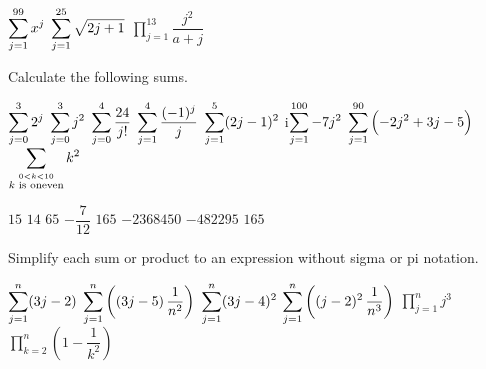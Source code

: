 \begin{Answer}\phantom{}
    \begin{multicols}{3}
		
		\Question $\displaystyle\sum_{j=1}^{99} x^j$ 
		\Question $\displaystyle\sum_{j=1}^{25} \sqrt{2j+1}$ 
		\Question $\displaystyle\prod_{j=1}^{13} \dfrac{j^2}{a+j}$ 
	    \EndCurrentQuestion
	\end{multicols}
\end{Answer}
	
\begin{Exercise} Calculate the following sums.
    \begin{multicols}{3}
    	\Question[difficulty = 1] $\displaystyle\sum_{j=0}^{3} 2^j$
    	\Question[difficulty = 1] $\displaystyle\sum_{j=0}^{3} j^2$
    	\Question[difficulty = 1] $\displaystyle\sum_{j=0}^{4} \dfrac{24}{j!}$
    	\Question[difficulty = 1] $\displaystyle\sum_{j=1}^{4} \dfrac{(-1)^j}{j}$
    	\Question[difficulty = 1] $\displaystyle\sum_{j=1}^{5} (2j-1)^2$
    	\ifanalysis\Question[difficulty = 1]i\fi \ifcalculus\Question[difficulty = 2]\fi $\displaystyle\sum_{j=1}^{100} -7j^2$
    	\ifanalysis\Question[difficulty = 1]\fi \ifcalculus\Question[difficulty = 2]\fi $\displaystyle\sum_{j=1}^{90} \left(-2j^2+3j-5\right)$
    	\ifanalysis\Question[difficulty = 1]\fi \ifcalculus\Question[difficulty = 2]\fi $\displaystyle\sum_{\stackrel{0<k<10}{k \text{ is oneven}}} k^2$
    	\EndCurrentQuestion
	\end{multicols}
\end{Exercise}

\begin{Answer}\phantom{}
    \begin{multicols}{3}
		
			\Question $15$ 
			\Question $14$ 
			\Question $65$ 
			\Question $- \dfrac{7}{12}$ 
			\Question $165$ 
			\Question $-2368450$
			\Question $-482295$  
		    \Question $165$ 
		\EndCurrentQuestion
	\end{multicols}
\end{Answer}
	
\begin{Exercise} Simplify each sum or product to an expression without sigma or pi notation. 
    \begin{multicols}{2}
    	\Question[difficulty = 1] $\displaystyle\sum_{j=1}^{n} (3j-2)$
    	\Question[difficulty = 1] $\displaystyle\sum_{j=1}^{n} \left( (3j-5)\,\dfrac{1}{n^2} \right)$		
    	\ifanalysis\Question[difficulty = 1]\fi \ifcalculus\Question[difficulty = 2]\fi $\displaystyle\sum_{j=1}^{n} (3j-4)^2$
    	\ifanalysis\Question[difficulty = 1]\fi \ifcalculus\Question[difficulty = 2]\fi $\displaystyle\sum_{j=1}^{n} \left( (j-2)^2\,\dfrac{1}{n^3} \right)$
    	\Question[difficulty = 2] $\displaystyle\prod_{j=1}^{n} j^3$
    	\Question[difficulty = 3] $\displaystyle\prod_{k=2}^{n} \left(1- \dfrac{1}{k^2} \right)$
    	\EndCurrentQuestion
    \end{multicols}
\end{Exercise}

